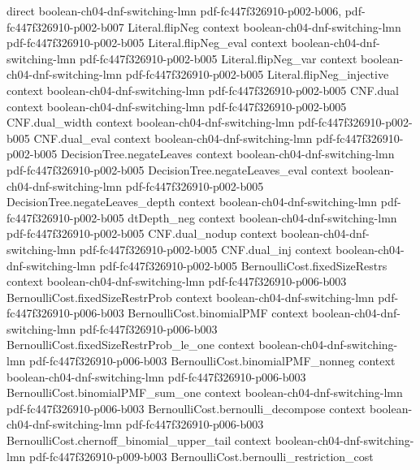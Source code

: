 \begin{theorem}
  {direct}
  {boolean-ch04-dnf-switching-lmn}
  {pdf-fc447f326910-p002-b006,
    pdf-fc447f326910-p002-b007}
\proofstep
  {Literal.flipNeg}
  {context}
  {boolean-ch04-dnf-switching-lmn}
  {pdf-fc447f326910-p002-b005}
\proofstep
  {Literal.flipNeg_eval}
  {context}
  {boolean-ch04-dnf-switching-lmn}
  {pdf-fc447f326910-p002-b005}
\proofstep
  {Literal.flipNeg_var}
  {context}
  {boolean-ch04-dnf-switching-lmn}
  {pdf-fc447f326910-p002-b005}
\proofstep
  {Literal.flipNeg_injective}
  {context}
  {boolean-ch04-dnf-switching-lmn}
  {pdf-fc447f326910-p002-b005}
\proofstep
  {CNF.dual}
  {context}
  {boolean-ch04-dnf-switching-lmn}
  {pdf-fc447f326910-p002-b005}
\proofstep
  {CNF.dual_width}
  {context}
  {boolean-ch04-dnf-switching-lmn}
  {pdf-fc447f326910-p002-b005}
\proofstep
  {CNF.dual_eval}
  {context}
  {boolean-ch04-dnf-switching-lmn}
  {pdf-fc447f326910-p002-b005}
\proofstep
  {DecisionTree.negateLeaves}
  {context}
  {boolean-ch04-dnf-switching-lmn}
  {pdf-fc447f326910-p002-b005}
\proofstep
  {DecisionTree.negateLeaves_eval}
  {context}
  {boolean-ch04-dnf-switching-lmn}
  {pdf-fc447f326910-p002-b005}
\proofstep
  {DecisionTree.negateLeaves_depth}
  {context}
  {boolean-ch04-dnf-switching-lmn}
  {pdf-fc447f326910-p002-b005}
\proofstep
  {dtDepth_neg}
  {context}
  {boolean-ch04-dnf-switching-lmn}
  {pdf-fc447f326910-p002-b005}
\proofstep
  {CNF.dual_nodup}
  {context}
  {boolean-ch04-dnf-switching-lmn}
  {pdf-fc447f326910-p002-b005}
\proofstep
  {CNF.dual_inj}
  {context}
  {boolean-ch04-dnf-switching-lmn}
  {pdf-fc447f326910-p002-b005}
\proofstep
  {BernoulliCost.fixedSizeRestrs}
  {context}
  {boolean-ch04-dnf-switching-lmn}
  {pdf-fc447f326910-p006-b003}
\proofstep
  {BernoulliCost.fixedSizeRestrProb}
  {context}
  {boolean-ch04-dnf-switching-lmn}
  {pdf-fc447f326910-p006-b003}
\proofstep
  {BernoulliCost.binomialPMF}
  {context}
  {boolean-ch04-dnf-switching-lmn}
  {pdf-fc447f326910-p006-b003}
\proofstep
  {BernoulliCost.fixedSizeRestrProb_le_one}
  {context}
  {boolean-ch04-dnf-switching-lmn}
  {pdf-fc447f326910-p006-b003}
\proofstep
  {BernoulliCost.binomialPMF_nonneg}
  {context}
  {boolean-ch04-dnf-switching-lmn}
  {pdf-fc447f326910-p006-b003}
\proofstep
  {BernoulliCost.binomialPMF_sum_one}
  {context}
  {boolean-ch04-dnf-switching-lmn}
  {pdf-fc447f326910-p006-b003}
\proofstep
  {BernoulliCost.bernoulli_decompose}
  {context}
  {boolean-ch04-dnf-switching-lmn}
  {pdf-fc447f326910-p006-b003}
\proofstep
  {BernoulliCost.chernoff_binomial_upper_tail}
  {context}
  {boolean-ch04-dnf-switching-lmn}
  {pdf-fc447f326910-p009-b003}
\proofstep
  {BernoulliCost.bernoulli_restriction_cost}

\end{theorem}
